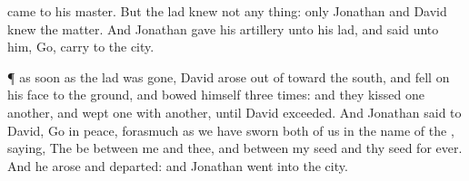 {came to his
master.
But the
lad
knew not any
thing: only
Jonathan and
David
knew the
matter.
And
Jonathan
gave his
artillery unto his
lad, and
said unto him,
Go,
carry
{} to the
city.
\par }{\PP {}¶
{} as soon as the
lad was
gone,
David
arose out of
{}
toward the
south, and
fell on his
face to the
ground, and
bowed himself
three
times: and they
kissed
one
another, and
wept
one with
another, until
David
exceeded.
And
Jonathan
said to
David,
Go in
peace, forasmuch as we have
sworn
both of us in the
name of the
{},
saying, The
{} be between me and thee, and between my
seed and thy
seed
for
ever. And he
arose and
departed: and
Jonathan
went into the
city.

}
